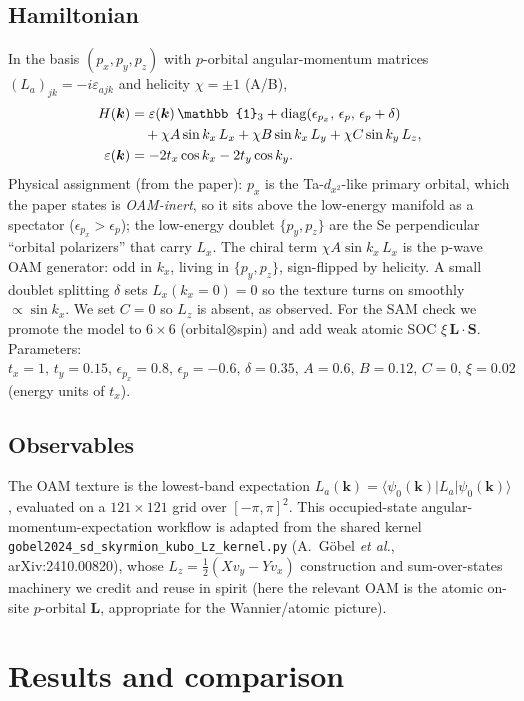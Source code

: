 \documentclass[aps,prl,twocolumn,superscriptaddress,floatfix]{revtex4-2}
\begin{document}
\subsection{Hamiltonian}
In the basis $(p_x,p_y,p_z)$ with $p$-orbital angular-momentum matrices
$(L_a)_{jk}=-i\varepsilon_{ajk}$ and helicity $\chi=\pm1$ (A/B),
\begin{align}
H(\bm{k}) &= \varepsilon(\bm{k})\,\mathbb{1}_3
   + \mathrm{diag}(\epsilon_{p_x},\,\epsilon_{p},\,\epsilon_{p}+\delta) \notag\\
&\quad + \chi A\sin k_x\,L_x + \chi B\sin k_x\,L_y + \chi C\sin k_y\,L_z,\\
\varepsilon(\bm{k}) &= -2t_x\cos k_x - 2t_y\cos k_y .
\end{align}
Physical assignment (from the paper): $p_x$ is the Ta-$d_{x^2}$-like primary
orbital, which the paper states is \emph{OAM-inert}, so it sits above the
low-energy manifold as a spectator ($\epsilon_{p_x}>\epsilon_p$); the
low-energy doublet $\{p_y,p_z\}$ are the Se perpendicular ``orbital polarizers''
that carry $L_x$. The chiral term $\chi A\sin k_x\,L_x$ is the p-wave OAM
generator: odd in $k_x$, living in $\{p_y,p_z\}$, sign-flipped by helicity. A
small doublet splitting $\delta$ sets $L_x(k_x{=}0){=}0$ so the texture turns on
smoothly $\propto\sin k_x$. We set $C=0$ so $L_z$ is absent, as observed.
For the SAM check we promote the model to $6\times6$ (orbital$\otimes$spin) and
add weak atomic SOC $\xi\,\bm{L}\!\cdot\!\bm{S}$.
Parameters: $t_x{=}1,\,t_y{=}0.15,\,\epsilon_{p_x}{=}0.8,\,\epsilon_p{=}-0.6,\,
\delta{=}0.35,\,A{=}0.6,\,B{=}0.12,\,C{=}0,\,\xi{=}0.02$ (energy units of $t_x$).

\subsection{Observables}
The OAM texture is the lowest-band expectation
$L_a(\bm{k})=\langle\psi_0(\bm{k})|L_a|\psi_0(\bm{k})\rangle$, evaluated on a
$121\times121$ grid over $[-\pi,\pi]^2$. This occupied-state
angular-momentum-expectation workflow is adapted from the shared kernel
\texttt{gobel2024\_sd\_skyrmion\_kubo\_Lz\_kernel.py} (A.~G\"obel \textit{et
al.}, arXiv:2410.00820), whose $L_z=\tfrac12(Xv_y-Yv_x)$ construction and
sum-over-states machinery we credit and reuse in spirit (here the relevant OAM
is the atomic on-site $p$-orbital $\bm{L}$, appropriate for the Wannier/atomic
picture).

\section{Results and comparison}
\end{document}
